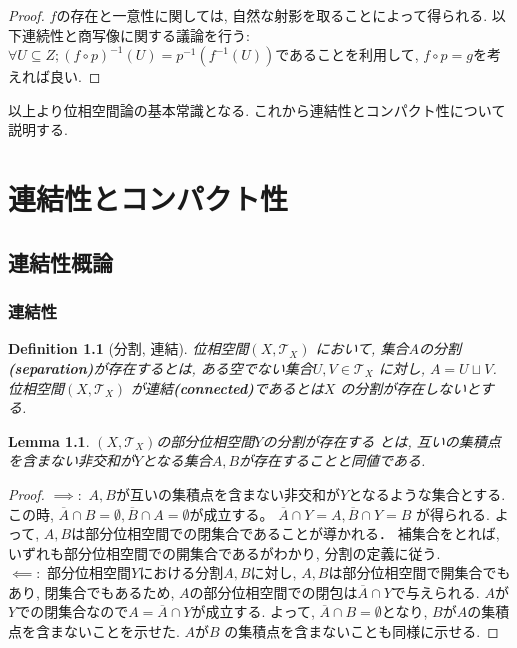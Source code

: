 \documentclass[dvipdfmx]{jbook}
\newcommand{\cl}[1]{\overline{ #1}  }
\newtheorem{lemma}[theorem]{Lemma}
\newtheorem{definition}{Definition}[section]
\theoremstyle{remark}
\theoremstyle{plain}
\begin{document}
\begin{proof}%
	$f$の存在と一意性に関しては, 自然な射影を取ることによって得られる. 以下連続性と商写像に関する議論を行う:
	 $\forall U \subseteq Z; \left( f\circ p \right) ^{-1}(U) = p^{-1}(f^{-1}(U))$であることを利用して, $f\circ p =g$を考えれば良い. 
\end{proof}
以上より位相空間論の基本常識となる. これから連結性とコンパクト性について説明する.

\chapter{連結性とコンパクト性}%
\label{cha:連結性とコンパクト性}

\section{連結性概論}

\subsection{連結性}

\begin{definition}[分割, 連結]
	位相空間$\left( X , \mathcal{T}_X \right) $ において, 集合$A$の分割\textbf{(separation)}が存在するとは, ある空でない集合$U,V \in \mathcal{T}_X$ に対し, $A=U \sqcup   V $. 位相空間$\left( X,\mathcal{T}_X \right) $ が連結\textbf{(connected)}であるとは$X$ の分割が存在しないとする.
\end{definition} 

\begin{lemma}
$(X, \mathcal{T}_X)$の部分位相空間$Y$の分割が存在する
とは, 互いの集積点を含まない非交和が$Y$となる集合$A,B$が存在することと同値である.
\end{lemma}

\begin{proof}
	$\implies:$ $A,B$が互いの集積点を含まない非交和が$Y$となるような集合とする. 
	この時, $ \cl{A} \cap B = \emptyset, \cl{B} \cap A = \emptyset$が成立する。
	$\cl{A} \cap Y = A, \cl{B} \cap Y = B$ が得られる.
	よって, $A,B$は部分位相空間での閉集合であることが導かれる．
	補集合をとれば, いずれも部分位相空間での開集合であるがわかり, 分割の定義に従う.\\
	$\impliedby:$ 部分位相空間$Y$における分割$A,B$に対し, $A,B$は部分位相空間で開集合でもあり, 
	閉集合でもあるため, $A$の部分位相空間での閉包は$\cl{A} \cap Y$で与えられる. 
	$A$が$Y$での閉集合なので$A = \cl{A} \cap Y$が成立する. 
	よって, $\cl{A} \cap B = \emptyset$となり, $B$が$A$の集積点を含まないことを示せた. 
	$A$が$B$ の集積点を含まないことも同様に示せる.
\end{proof}
\end{document}
